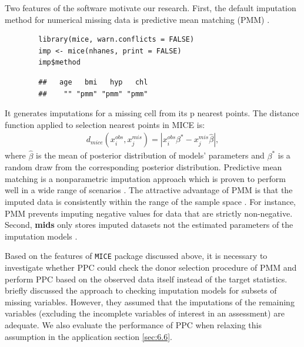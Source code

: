 	Two features of the software motivate our research. First, the default imputation method for numerical missing data is predictive mean matching (PMM) \citep{little1988missing}.
	\begin{lstlisting}
		library(mice, warn.conflicts = FALSE)
		imp <- mice(nhanes, print = FALSE)
		imp$method
	\end{lstlisting}
	\begin{verbatim}
		##   age   bmi   hyp   chl 
		##    "" "pmm" "pmm" "pmm"
	\end{verbatim}
	It generates imputations for a missing cell from its p nearest points. The distance function applied to selection nearest points in MICE is:
	\begin{equation}
		\begin{array}{ll}
			d_{mice}(x_{i}^{obs}, x_{j}^{mis}) = |x_{i}^{obs}\beta^{*} - x_{j}^{mis}\hat{\beta}|,
		\end{array} 
	\end{equation}
	where $\hat{\beta}$ is the mean of posterior distribution of models' parameters and $\beta^{*}$ is a random draw from the corresponding posterior distribution. Predictive mean matching is a nonparametric imputation approach which is proven to perform well in a wide range of scenarios \citep{de2011handbook, siddique2008multiple, su2011multiple, Buuren2018, Buuren2011, Vink2014, white2011multiple, Vink2015, yu2007evaluation}. The attractive advantage of PMM is that the imputed data is consistently within the range of the sample space \citep{heeringa2001multivariate, Buuren2018, Vink2014, Vink2015, white2011multiple, yu2007evaluation}. For instance, PMM prevents imputing negative values for data that are strictly non-negative. Second, \textbf{mids} only stores imputed datasets not the estimated parameters of the imputation models \citep{hoogland2020handling}. 
	
	Based on the features of \texttt{MICE} package discussed above, it is necessary to investigate whether PPC could check the donor selection procedure of PMM and perform PPC based on the observed data itself instead of the target statistics. \citet{he2012diagnosing} briefly discussed the approach to checking imputation models for subsets of missing variables. However, they assumed that the imputations of the remaining variables (excluding the incomplete variables of interest in an assessment) are adequate. We also evaluate the performance of PPC when relaxing this assumption in the application section \ref{sec:6.6}.      
	
